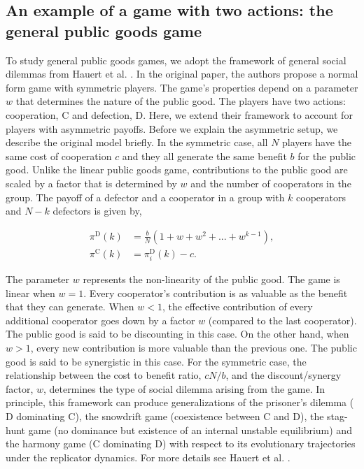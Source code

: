 \documentclass[11pt]{article}
\theoremstyle{plainCl1}
\theoremstyle{plainCl2}
\newcommand{\C}{\mathrm{C}}
\newcommand{\D}{\mathrm{D}}
\begin{document}
\subsection{An example of a  game with two actions: the general public goods game}

To study general public goods games, we adopt the framework of general social dilemmas from Hauert et al. \cite{Hauert:JTB:2006a}. In the original paper, the authors propose a normal form game with symmetric players. The game's properties depend on a parameter $w$ that determines the nature of the public good. The players have two actions: cooperation, $\C$ and defection, $\D$. Here, we extend their framework to account for players with asymmetric payoffs. Before we explain the asymmetric setup, we describe the original model briefly. In the symmetric case, all $N$ players have the same cost of cooperation $c$ and they all generate the same benefit $b$ for the public good. Unlike the linear public goods game, contributions to the public good are scaled by a factor that is determined by $w$ and the number of cooperators in the group. The payoff of a defector and a cooperator in a group with $k$ cooperators and $N-k$ defectors is given by, 

\begin{align}
\pi^{\D}(k) &= \frac{b}{N}(1 + w + w^2 + ... + w^{k-1}), \\[15pt]
\pi^{\C}(k) &= \pi^{\D}_i(k) - c .
\label{Eq:payoff-synergistic-symmetric}
\end{align} 

\noindent The parameter $w$ represents the non-linearity of the public good. The game is linear when $w = 1$. Every cooperator's contribution is as valuable as the benefit that they can generate. When $w < 1$, the effective contribution of every additional cooperator goes down by a factor $w$ (compared to the last cooperator). The public good is said to be discounting in this case. On the other hand, when $w > 1$, every new contribution is more valuable than the previous one. The public good is said to be synergistic in this case. For the symmetric case, the relationship between the cost to benefit ratio, $cN/b$, and the discount/synergy factor, $w$, determines the type of social dilemma arising from the game. In principle, this framework can produce generalizations of the prisoner's dilemma ($\D$ dominating $\C$), the snowdrift game (coexistence between $\C$ and $\D$), the stag-hunt game (no dominance but existence of an internal unstable equilibrium) and the harmony game ($\C$ dominating $\D$) with respect to its evolutionary trajectories under the replicator dynamics. For more details see Hauert et al. \cite{Hauert:JTB:2006a}. \\ 
\end{document}
